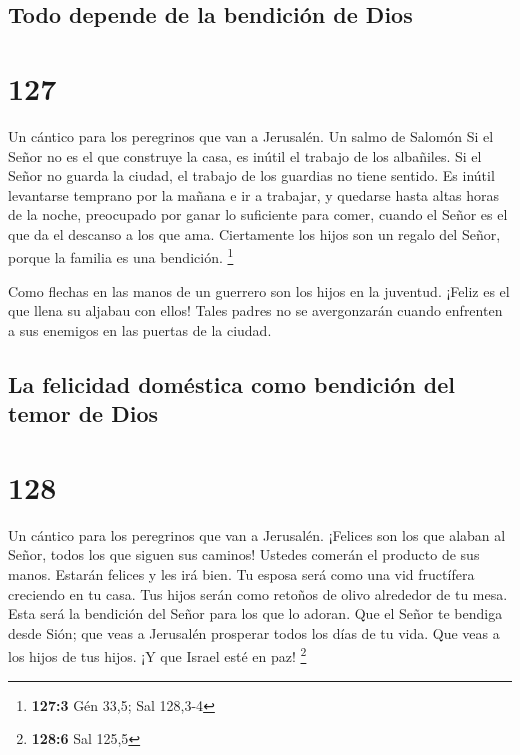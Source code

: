 \hypertarget{todo-depende-de-la-bendiciuxf3n-de-dios}{%
\subsection{Todo depende de la bendición de
Dios}\label{todo-depende-de-la-bendiciuxf3n-de-dios}}

\hypertarget{section-126}{%
\section{127}\label{section-126}}

Un cántico para los peregrinos que van a Jerusalén. Un salmo de Salomón
 Si el Señor no es el que construye la casa, es inútil el
trabajo de los albañiles. Si el Señor no guarda la ciudad, el trabajo de
los guardias no tiene sentido.  Es inútil levantarse
temprano por la mañana e ir a trabajar, y quedarse hasta altas horas de
la noche, preocupado por ganar lo suficiente para comer, cuando el Señor
es el que da el descanso a los que ama.  Ciertamente los
hijos son un regalo del Señor, porque la familia es una bendición.
\footnote{\textbf{127:3} Gén 33,5; Sal 128,3-4}

 Como flechas en las manos de un guerrero son los hijos en
la juventud.  ¡Feliz es el que llena su aljabau con ellos!
Tales padres no se avergonzarán cuando enfrenten a sus enemigos en las
puertas de la ciudad.

\hypertarget{la-felicidad-domuxe9stica-como-bendiciuxf3n-del-temor-de-dios}{%
\subsection{La felicidad doméstica como bendición del temor de
Dios}\label{la-felicidad-domuxe9stica-como-bendiciuxf3n-del-temor-de-dios}}

\hypertarget{section-127}{%
\section{128}\label{section-127}}

Un cántico para los peregrinos que van a Jerusalén. 
¡Felices son los que alaban al Señor, todos los que siguen sus caminos!
 Ustedes comerán el producto de sus manos. Estarán felices y
les irá bien.  Tu esposa será como una vid fructífera
creciendo en tu casa. Tus hijos serán como retoños de olivo alrededor de
tu mesa.  Esta será la bendición del Señor para los que lo
adoran.  Que el Señor te bendiga desde Sión; que veas a
Jerusalén prosperar todos los días de tu vida.  Que veas a
los hijos de tus hijos. ¡Y que Israel esté en paz! \footnote{\textbf{128:6}
  Sal 125,5}

